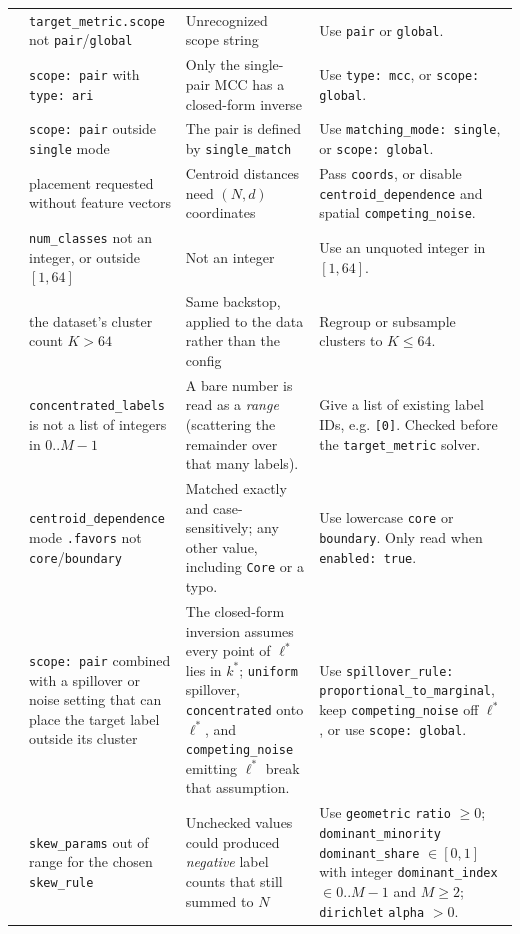 \documentclass[a4paper,11pt]{article}
\newcommand{\vcode}[1]{\textcolor{valred}{\bfseries\ttfamily #1}}
\begin{document}
\begin{longtable}{@{}L{1.0cm} L{3.5cm} L{4.6cm} L{5.4cm}@{}}
\vcode{122} & \texttt{target\_metric.scope} not \texttt{pair}/\texttt{global} & Unrecognized scope string & Use \texttt{pair} or \texttt{global}. \\
\vcode{123} & \texttt{scope: pair} with \texttt{type: ari} & Only the single-pair MCC has a closed-form inverse & Use \texttt{type: mcc}, or \texttt{scope: global}. \\
\vcode{124}& \texttt{scope: pair} outside \texttt{single} mode & The pair is defined by \texttt{single\_match} & Use \texttt{matching\_mode: single}, or \texttt{scope: global}. \\
\vcode{125} & placement requested without feature vectors & Centroid distances need $(N,d)$ coordinates & Pass \texttt{coords}, or disable \texttt{centroid\_dependence} and spatial \texttt{competing\_noise}. \\
\vcode{126} & \texttt{num\_classes} not an integer, or outside $[1,64]$ & Not an integer & Use an unquoted integer in $[1,64]$. \\
\vcode{127} & the dataset's cluster count $K > 64$ & Same backstop, applied to the data rather than the config & Regroup or subsample clusters to $K\leq64$. \\
\vcode{128} & \texttt{concentrated\_labels} is not a list of integers in $0..M{-}1$ & A bare number is read as a \emph{range} (scattering the remainder over that many labels). & Give a list of existing label IDs, e.g. \texttt{[0]}. Checked before the \texttt{target\_metric} solver. \\
\vcode{129} & \texttt{centroid\_dependence} mode \texttt{.favors} not \texttt{core}/\texttt{boundary} & Matched exactly and case-sensitively; any other value, including \texttt{Core} or a typo. & Use lowercase \texttt{core} or \texttt{boundary}. Only read when \texttt{enabled: true}. \\
\vcode{130} & \texttt{scope: pair} combined with a spillover or noise setting that can place the target label outside its cluster & The closed-form inversion assumes every point of $\ell^*$ lies in $k^*$; \texttt{uniform} spillover, \texttt{concentrated} onto $\ell^*$, and \texttt{competing\_noise} emitting $\ell^*$ break that assumption. & Use \texttt{spillover\_rule: proportional\_to\_marginal}, keep \texttt{competing\_noise} off $\ell^*$, or use \texttt{scope: global}. \\
\vcode{131} & \texttt{skew\_params} out of range for the chosen \texttt{skew\_rule} & Unchecked values could produced \emph{negative} label counts that still summed to $N$ & Use \texttt{geometric} \texttt{ratio} $\geq 0$; \texttt{dominant\_minority} \texttt{dominant\_share} $\in[0,1]$ with integer \texttt{dominant\_index} $\in 0..M{-}1$ and $M\geq2$; \texttt{dirichlet} \texttt{alpha} $>0$.\\

\end{longtable}
\end{document}
